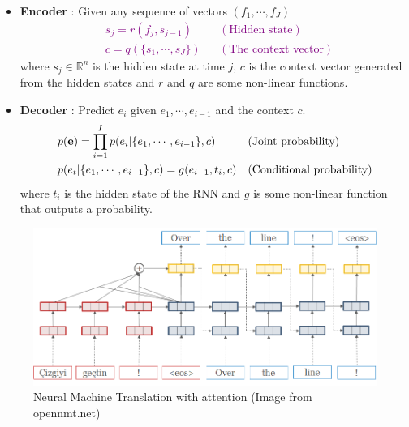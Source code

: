 \documentclass[landscape]{jhuslides3C}
\newcommand{\maths}[1]{\textcolor{purple}{#1}}
\begin{document}
\begin{itemize}
	\item \textbf{Encoder} : Given any sequence of vectors $(f_1,\cdots,f_J)$
	\maths{\begin{align*}
		& s_j = r(f_j, s_{j-1}) && (\text{Hidden state})\\
		& c = q(\{s_1,\cdots,s_J\}) && (\text{The context vector})
		\end{align*}}
		where $s_j \in \mathbb{R}^n$ is the hidden state at time $j$, $c$ is the context
		vector generated from the hidden states and $r$ and $q$ are some non-linear functions. 
	\item \textbf{Decoder} : Predict $e_i$ given $e_1 , \cdots , e_{i-1}$ and the context $c$.
	\maths{\begin{align*}
		& p({\bf e}) = \prod_{i=1}^{I} p(e_i | \{e_1 , \cdots , e_{i-1}\}, c) && (\text{Joint probability})\\
		& p(e_t | \{e_1 , \cdots , e_{i-1}\}, c) = g(e_{i-1}, t_i, c) && (\text{Conditional probability})
		\end{align*}}
		where $t_i$ is the hidden state of the RNN and $g$ is some non-linear 
		function that outputs a probability. 
\end{itemize}

\vspace{10mm}
\begin{figure}
\begin{center}
\includegraphics[scale=1]{images/simple-attn.png}
\caption{Neural Machine Translation with attention ({\tiny Image from opennmt.net})}
\end{center}
\end{figure}
\end{document}
